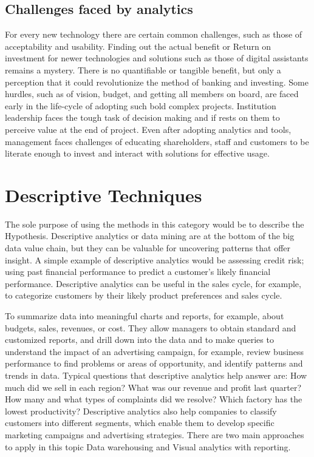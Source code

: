 \newpage
\section{Challenges faced by analytics}
For every new technology there are certain common challenges, such as those of acceptability and usability. Finding out the actual benefit or Return on investment for newer technologies and solutions such as those of digital assistants remains a mystery. There is no quantifiable or tangible benefit, but only a perception that it could revolutionize the method of banking and investing.
Some hurdles, such as of vision, budget, and getting all members on board, are faced early in the life-cycle of adopting such bold complex projects. Institution leadership faces the tough task of decision making and if rests on them to perceive value at the end of project.
Even after adopting analytics and tools, management faces challenges of educating shareholders, staff and customers to be literate enough to invest and interact with solutions for effective usage.




\chapter{Descriptive Techniques} 
\label{ch:literature-review}

The sole purpose of using the methods in this category would be to describe the Hypothesis. Descriptive analytics or data mining are at the bottom of the big data value chain, but they can be valuable for uncovering patterns that offer insight. A simple example of descriptive analytics would be assessing credit risk; using past financial performance to predict a customer’s likely financial performance. Descriptive analytics can be useful in the sales cycle, for example, to categorize customers by their likely product preferences and sales cycle.

To summarize data into meaningful charts and reports, for example, about budgets, sales, revenues, or cost. They allow managers to obtain standard and customized reports, and drill down into the data and to make queries to understand the impact of an advertising campaign, for example, review business performance to find problems or areas of opportunity, and identify patterns and trends in data. Typical questions that descriptive analytics help answer are: How much did we sell in each region? What was our revenue and profit last quarter? How many and what types of complaints did we resolve? Which factory has the lowest productivity? Descriptive analytics also help companies to classify customers into different segments, which enable them to develop specific marketing campaigns and advertising strategies.
There are two main approaches to apply in this topic Data warehousing and Visual analytics with reporting.

